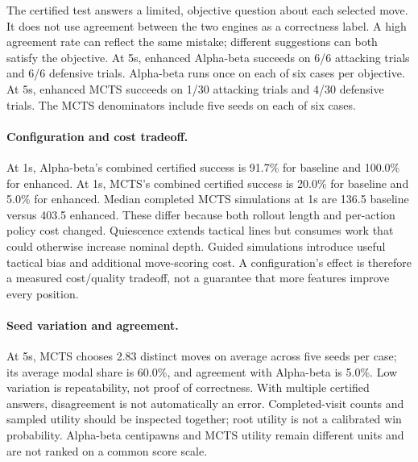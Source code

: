 The certified test answers a limited, objective question about each selected move.
It does not use agreement between the two engines as a correctness label.
A high agreement rate can reflect the same mistake; different suggestions can both satisfy the objective.
At 5s, enhanced Alpha-beta succeeds on 6/6 attacking trials and 6/6 defensive trials. Alpha-beta runs once on each of six cases per objective.
At 5s, enhanced MCTS succeeds on 1/30 attacking trials and 4/30 defensive trials. The MCTS denominators include five seeds on each of six cases.
\paragraph{Configuration and cost tradeoff.}
At 1s, Alpha-beta's combined certified success is 91.7\% for baseline and 100.0\% for enhanced.
At 1s, MCTS's combined certified success is 20.0\% for baseline and 5.0\% for enhanced.
Median completed MCTS simulations at 1s are 136.5 baseline versus 403.5 enhanced. These differ because both rollout length and per-action policy cost changed.
Quiescence extends tactical lines but consumes work that could otherwise increase nominal depth.
Guided simulations introduce useful tactical bias and additional move-scoring cost.
A configuration's effect is therefore a measured cost/quality tradeoff, not a guarantee that more features improve every position.
\paragraph{Seed variation and agreement.}
At 5s, MCTS chooses 2.83 distinct moves on average across five seeds per case; its average modal share is 60.0\%, and agreement with Alpha-beta is 5.0\%.
Low variation is repeatability, not proof of correctness. With multiple certified answers, disagreement is not automatically an error.
Completed-visit counts and sampled utility should be inspected together; root utility is not a calibrated win probability.
Alpha-beta centipawns and MCTS utility remain different units and are not ranked on a common score scale.
